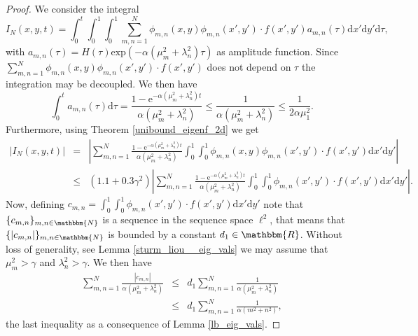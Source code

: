 \documentclass[a4paper,11pt]{article}
\theoremstyle{plain} %
\theoremstyle{definition} %
\theoremstyle{remark} %
\theoremstyle{remark}
\begin{document}
\begin{proof}
We consider the integral
\begin{equation*}
I_N (x,y, t) = \int_0^t\!\int_0^1\!\int_0^1  \sum_{m,n =1 }^N \phi_{m,n} (x,y) \phi_{m,n} (x', y' ) \cdot  f (x',y') a_{m,n } (\tau ) \mathrm{d}x' \mathrm{d}y' \mathrm{d}\tau ,
\end{equation*}
with $ a_{m,n } (\tau ) = H(\tau ) \mathrm{exp} (-\alpha (\mu^2_m + \lambda^2_n) \tau ) $ as amplitude function. Since $\sum_{m,n =1 }^N \phi_{m,n} (x,y) \phi_{m,n} (x', y' ) \cdot  f (x',y') $ does not depend on $ \tau $ the integration may be decoupled. %
We then have
\begin{equation*}
\int_0^t a_{m,n } (\tau ) \mathrm{d}\tau = \frac{1 - \mathrm{e}^{-\alpha (\mu^2_m + \lambda^2_n) t } }{\alpha (\mu^2_m + \lambda^2_n)} \leq \frac{1 }{\alpha (\mu^2_m + \lambda^2_n)} \leq \frac{1 }{2\alpha \mu^2_1} .
\end{equation*}
Furthermore, using Theorem \ref{unibound_eigenf_2d} we get
\begin{eqnarray*}
\left| I_N (x,y, t)\right| & = &  \left|\sum_{m,n =1 }^N \frac{1 - \mathrm{e}^{-\alpha (\mu^2_m + \lambda^2_n) t }}{\alpha (\mu^2_m + \lambda^2_n)} \int_0^1\!\int_0^1 \phi_{m,n} (x,y) \phi_{m,n} (x', y' ) \cdot  f (x',y')  \mathrm{d}x' \mathrm{d}y' \right| \\
& \leq & \left( 1.1 + 0.3\gamma^2 \right) \left| \sum_{m,n =1 }^N \frac{1 - \mathrm{e}^{-\alpha (\mu^2_m + \lambda^2_n) t } }{\alpha (\mu^2_m + \lambda^2_n)} \int_0^1\!\int_0^1 \phi_{m,n} (x', y' ) \cdot  f (x',y')  \mathrm{d}x' \mathrm{d}y' \right| .
\end{eqnarray*}
Now, defining $ c_{m,n} = \int_0^1\!\int_0^1 \phi_{m,n} (x', y' ) \cdot  f (x',y')  \mathrm{d}x' \mathrm{d}y' $ note that $ \{ c_{m,n} \}_{m,n \in \mathbbm{N}} $ is a sequence in the sequence space $ \ell^2 $, that means that $ \{ | c_{m,n} | \}_{m,n \in \mathbbm{N}} $ is bounded by a constant $d_1 \in \mathbbm{R} $. Without loss of generality, see Lemma \ref{sturm_liou__eig_vals} we may assume that $\mu^2_m > \gamma $ and $ \lambda^2_n > \gamma $. We then have
\begin{eqnarray*}
\sum_{m,n =1 }^N \frac{ | c_{m,n} | }{\alpha (\mu^2_m + \lambda^2_n)} & \leq & d_1 \sum_{m,n =1 }^N \frac{ 1 }{\alpha (\mu^2_m + \lambda^2_n)} \\
& \leq & d_1 \sum_{m,n =1 }^N \frac{ 1 }{\alpha (m^2 +n^2 )},
\end{eqnarray*}
the last inequality as a consequence of Lemma \ref{lb_eig_vals}.

\end{proof}
\end{document}
